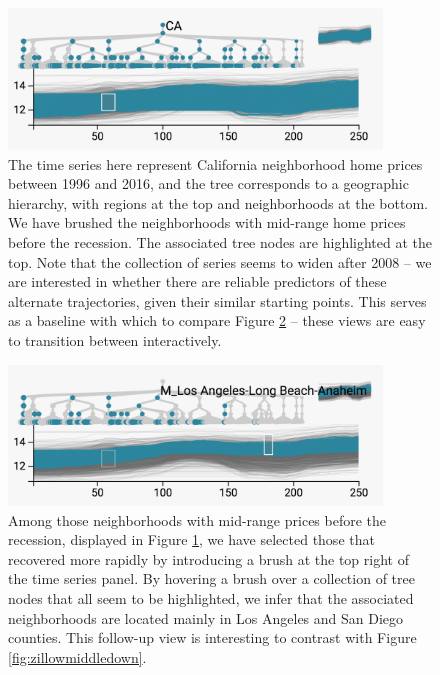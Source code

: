 \begin{figure}

{\centering \includegraphics[width=375px]{figure/treelapse/zillow_middle_pre}

}

\caption{The time series here represent California neighborhood home prices
  between 1996 and 2016, and the tree corresponds to a geographic hierarchy,
  with regions at the top and neighborhoods at the bottom. We have brushed the
  neighborhoods with mid-range home prices before the recession. The associated
  tree nodes are highlighted at the top. Note that the collection of series
  seems to widen after 2008 -- we are interested in whether there are reliable
  predictors of these alternate trajectories, given their similar starting
  points. This serves as a baseline with which to compare Figure
  \ref{fig:zillowmiddleup} -- these views are easy to transition between
  interactively.}\label{fig:zillowmiddlepre}
\end{figure}

\begin{figure}

{\centering \includegraphics[width=375px]{figure/treelapse/zillow_middle_up}

}

\caption{Among those neighborhoods with mid-range prices before the recession,
  displayed in Figure \ref{fig:zillowmiddlepre}, we have selected those that
  recovered more rapidly by introducing a brush at the top right of the time
  series panel. By hovering a brush over a collection of tree nodes that all
  seem to be highlighted, we infer that the associated neighborhoods are located
  mainly in Los Angeles and San Diego counties. This follow-up view is
  interesting to contrast with Figure \ref{fig:zillowmiddledown}.
}\label{fig:zillowmiddleup}
\end{figure}

